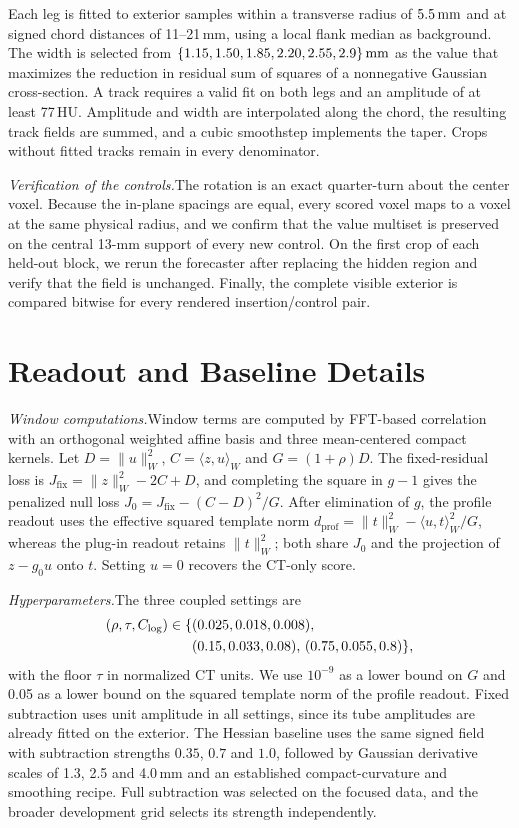 Each leg is fitted to exterior samples within a transverse radius of $5.5\,\mathrm{mm}$ and at signed chord distances of 11--21\,mm, using a local flank median as background. The width is selected from $\{1.15,1.50,1.85,2.20,2.55,2.9\}\,\mathrm{mm}$ as the value that maximizes the reduction in residual sum of squares of a nonnegative Gaussian cross-section. A track requires a valid fit on both legs and an amplitude of at least 77\,HU. Amplitude and width are interpolated along the chord, the resulting track fields are summed, and a cubic smoothstep implements the taper. Crops without fitted tracks remain in every denominator.

\smallskip\noindent\textit{Verification of the controls.}\enspace The rotation is an exact quarter-turn about the center voxel. Because the in-plane spacings are equal, every scored voxel maps to a voxel at the same physical radius, and we confirm that the value multiset is preserved on the central 13-mm support of every new control. On the first crop of each held-out block, we rerun the forecaster after replacing the hidden region and verify that the field is unchanged. Finally, the complete visible exterior is compared bitwise for every rendered insertion/control pair.

\section{Readout and Baseline Details}
\label{supp:heads}
\smallskip\noindent\textit{Window computations.}\enspace Window terms are computed by FFT-based correlation with an orthogonal weighted affine basis and three mean-centered compact kernels. Let $D=\|u\|_W^2$, $C=\langle z,u\rangle_W$ and $G=(1+\rho)D$. The fixed-residual loss is $J_{\mathrm{fix}}=\|z\|_W^2-2C+D$, and completing the square in $g-1$ gives the penalized null loss $J_0=J_{\mathrm{fix}}-(C-D)^2/G$. After elimination of $g$, the profile readout uses the effective squared template norm $d_{\mathrm{prof}}=\|t\|_W^2-\langle u,t\rangle_W^2/G$, whereas the plug-in readout retains $\|t\|_W^2$; both share $J_0$ and the projection of $z-g_0u$ onto $t$. Setting $u=0$ recovers the CT-only score.

\smallskip\noindent\textit{Hyperparameters.}\enspace The three coupled settings are
\begin{align*}
(\rho,\tau,C_{\rm log})\in\{&(0.025,0.018,0.008),\\
&(0.15,0.033,0.08),\,(0.75,0.055,0.8)\},
\end{align*}
with the floor $\tau$ in normalized CT units. We use $10^{-9}$ as a lower bound on $G$ and 0.05 as a lower bound on the squared template norm of the profile readout. Fixed subtraction uses unit amplitude in all settings, since its tube amplitudes are already fitted on the exterior. The Hessian baseline uses the same signed field with subtraction strengths $0.35$, $0.7$ and $1.0$, followed by Gaussian derivative scales of 1.3, 2.5 and 4.0\,mm and an established compact-curvature and smoothing recipe. Full subtraction was selected on the focused data, and the broader development grid selects its strength independently.

